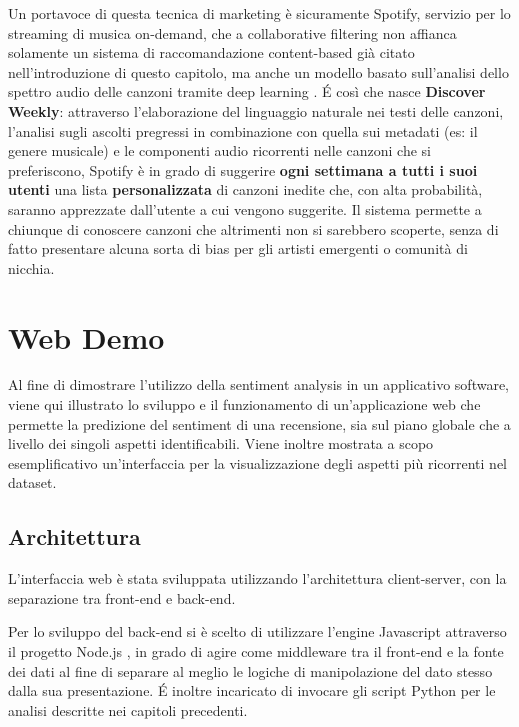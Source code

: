 \documentclass[hidelinks, 12pt]{article}
\begin{document}
Un portavoce di questa tecnica di marketing è sicuramente Spotify\cite{site:spotify}, servizio per lo streaming di musica on-demand, che a collaborative filtering non affianca solamente un sistema di raccomandazione content-based già citato nell'introduzione di questo capitolo, ma anche un modello basato sull'analisi dello spettro audio delle canzoni tramite deep learning \cite{site:spotify-article}. É così che nasce \textbf{Discover Weekly}\cite{site:spotify-discover}: attraverso l'elaborazione del linguaggio naturale nei testi delle canzoni, l'analisi sugli ascolti pregressi in combinazione con quella sui metadati (es: il genere musicale) e le componenti audio ricorrenti nelle canzoni che si preferiscono, Spotify è in grado di suggerire \textbf{ogni settimana a tutti i suoi utenti} una lista \textbf{personalizzata} di canzoni inedite che, con alta probabilità, saranno apprezzate dall'utente a cui vengono suggerite. Il sistema permette a chiunque di conoscere canzoni che altrimenti non si sarebbero scoperte, senza di fatto presentare alcuna sorta di bias per gli artisti emergenti o comunità di nicchia.



\clearpage



\section{Web Demo}
\label{sec:ui}

Al fine di dimostrare l'utilizzo della sentiment analysis in un applicativo software, viene qui illustrato lo sviluppo e il funzionamento di un'applicazione web che permette la predizione del sentiment di una recensione, sia sul piano globale che a livello dei singoli aspetti identificabili. Viene inoltre mostrata a scopo esemplificativo un'interfaccia per la visualizzazione degli aspetti più ricorrenti nel dataset.



\subsection{Architettura}

L'interfaccia web è stata sviluppata utilizzando l'architettura client-server, con la separazione tra front-end e back-end.

Per lo sviluppo del back-end si è scelto di utilizzare l'engine Javascript attraverso il progetto Node.js \cite{site:nodejs}, in grado di agire come middleware tra il front-end e la fonte dei dati al fine di separare al meglio le logiche di manipolazione del dato stesso dalla sua presentazione. \'E inoltre incaricato di invocare gli script Python per le analisi descritte nei capitoli precedenti.
\end{document}
